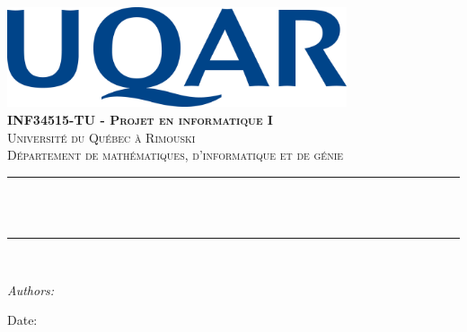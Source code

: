 \begin{titlepage}

\newcommand{\HRule}{\rule{\linewidth}{0.5mm}} %





\begin{center} %


\includegraphics[width = 10cm]{uqar}\\[1.5cm] 
\textbf{\textsc{\Large INF34515-TU - Projet en informatique I}}\\[1.0cm] 
\textsc{\Large Université du Québec à Rimouski}\\[0.5cm] 
\textsc{\large Département de mathématiques, d'informatique et de génie}\\[0.95cm] 


\HRule \\[0.4cm]
{ \huge \bfseries \reporttitle}\\ %
\HRule \\[1.5cm]
\end{center}

\begin{flushleft} \large
\textit{Authors:}\\
\reportauthorOne %
\end{flushleft}
\vspace{4cm}
\makeatletter
Date: \@date 

\vfill %



\makeatother


\end{titlepage}

